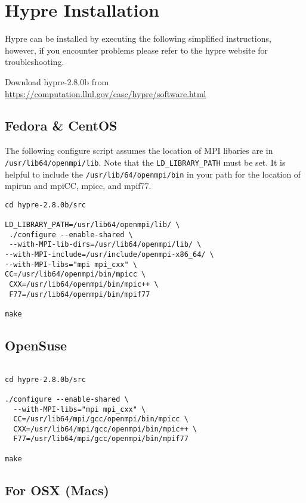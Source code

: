 \documentclass[11pt,fleqn]{book} %
\begin{document}
\chapter{Hypre Installation}

Hypre can be installed by executing the following simplified
instructions, however, if you encounter problems please refer to the
hypre website for troubleshooting.

Download hypre-2.8.0b from
\url{https://computation.llnl.gov/casc/hypre/software.html}

\section{Fedora \& CentOS}

The following configure script assumes the location of MPI libaries
are in \texttt{/usr/lib64/openmpi/lib}.  Note that the
\texttt{LD\_LIBRARY\_PATH} must be set.  It is helpful to include the
\texttt{/usr/lib/64/openmpi/bin} in your path for the location of
mpirun and mpiCC, mpicc, and mpif77.


\begin{lstlisting}
cd hypre-2.8.0b/src

LD_LIBRARY_PATH=/usr/lib64/openmpi/lib/ \
 ./configure --enable-shared \
 --with-MPI-lib-dirs=/usr/lib64/openmpi/lib/ \
--with-MPI-include=/usr/include/openmpi-x86_64/ \
--with-MPI-libs="mpi mpi_cxx" \
CC=/usr/lib64/openmpi/bin/mpicc \
 CXX=/usr/lib64/openmpi/bin/mpic++ \
 F77=/usr/lib64/openmpi/bin/mpif77

make

\end{lstlisting}

\section{OpenSuse}

\begin{lstlisting}

cd hypre-2.8.0b/src

./configure --enable-shared \
  --with-MPI-libs="mpi mpi_cxx" \
  CC=/usr/lib64/mpi/gcc/openmpi/bin/mpicc \
  CXX=/usr/lib64/mpi/gcc/openmpi/bin/mpic++ \
  F77=/usr/lib64/mpi/gcc/openmpi/bin/mpif77

make

\end{lstlisting}

\section{For OSX (Macs)}
\end{document}
